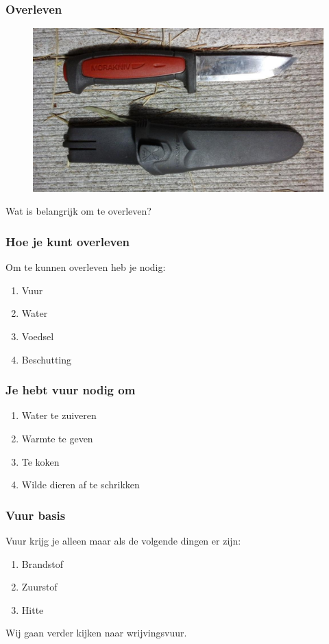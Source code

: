 \documentclass[a4paper, handout]{beamer}
\begin{document}
\begin{frame}
	\frametitle{Overleven}
	\begin{figure}
		\centering
	\includegraphics[scale=0.2]{mes}
\end{figure}

Wat is belangrijk om te overleven?
\end{frame}
\begin{frame}
	\frametitle{Hoe je kunt overleven}
	Om te kunnen overleven heb je nodig:
	\begin{enumerate}
		\item{Vuur}
		\item{Water}
		\item{Voedsel}
		\item{Beschutting}
	\end{enumerate}
\end{frame}

\begin{frame}
	\frametitle{Je hebt vuur nodig om}
	\begin{enumerate}
		\item{Water te zuiveren}
		\item{Warmte te geven}
		\item{Te koken}
		\item{Wilde dieren af te schrikken}
	\end{enumerate}
\end{frame}

\begin{frame}
	\frametitle{Vuur basis}
	Vuur krijg je alleen maar als de volgende dingen er zijn:
	\begin{enumerate}
		\item{Brandstof}
		\item{Zuurstof}
		\item{Hitte}
	\end{enumerate}
	Wij gaan verder kijken naar wrijvingsvuur.
\end{frame}
\end{document}
